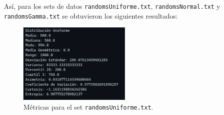 \documentclass[11pt]{article} %
\begin{document}
	Así, para los sets de datos \texttt{randomsUniforme.txt}, \texttt{randomsNormal.txt} y \texttt{randomsGamma.txt} se obtuvieron los siguientes resultados:
	
	\newpage
	
	\begin{figure}[h]
		\centering
		\includegraphics[width=0.49\textwidth]{resultadosUniforme.png}
		\caption{Métricas para el set \texttt{randomsUniforme.txt}.}
		\label{fig:resultados - distribución uniforme}
	\end{figure}
	
\end{document}

